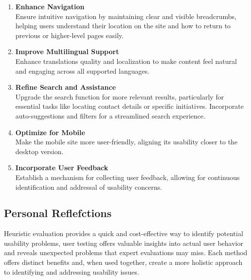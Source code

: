 \begin{enumerate}
	\item \textbf{Enhance Navigation}\\
	Ensure intuitive navigation by maintaining clear and visible breadcrumbs, helping users understand their location on the site and how to return to previous or higher-level pages easily.
	
	\item \textbf{Improve Multilingual Support}\\
	Enhance translations quality and localization to make content feel natural and engaging across all supported languages.
	
	\item \textbf{Refine Search and Assistance}\\
	Upgrade the search function for more relevant results, particularly for essential tasks like locating contact details or specific initiatives. 
	Incorporate auto-suggestions and filters for a streamlined search experience.

	\item \textbf{Optimize for Mobile}\\
	Make the mobile site more user-friendly, aligning its usability closer to the desktop version.

	\item \textbf{Incorporate User Feedback}\\
	Establish a mechanism for collecting user feedback, allowing for continuous identification and addressal of usability concerns.
\end{enumerate}

\subsection{Personal Reflefctions}
Heuristic evaluation provides a quick and cost-effective way to identify potential usability problems, user testing offers valuable insights into actual user behavior and reveals unexpected problems that expert evaluations may miss.
Each method offers distinct benefits and, when used together, create a more holistic approach to identifying and addressing usability issues.
